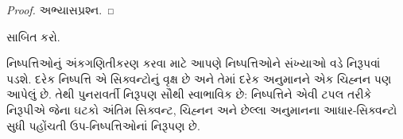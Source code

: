 \begin{proof} અભ્યાસપ્રશ્ન. \end{proof}

\begin{prob}
 સાબિત કરો.
\end{prob}
\endgroup


%
  \begingroup
\makeatletter{}\makeatother

\label{guunit:OLP-0286}


\begin{explain}
નિષ્પત્તિઓનું અંકગણિતીકરણ કરવા માટે
આપણે નિષ્પત્તિઓને સંખ્યાઓ વડે નિરૂપવાં પડશે.
દરેક નિષ્પત્તિ એ સિક્વન્ટોનું વૃક્ષ છે
અને તેમાં દરેક અનુમાનને એક ચિહ્નન પણ
આપેલું છે. તેથી પુનરાવર્તી નિરૂપણ
સૌથી સ્વાભાવિક છે: નિષ્પત્તિને
એવી ટપલ તરીકે નિરૂપીએ જેના ઘટકો
અંતિમ સિક્વન્ટ, ચિહ્નન અને છેલ્લા અનુમાનના
આધાર-સિક્વન્ટો સુધી પહોંચતી
ઉપ-નિષ્પત્તિઓનાં નિરૂપણ છે.
\end{explain}

